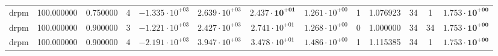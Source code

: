 \begin{table}
\begin{tabular}{ccccccccccccc}
drpm & 100.000000 & 0.750000 & 4 & $-1.335 \cdot 10^{+03}$ & $2.639 \cdot 10^{+03}$ & $\mathbf{2.437 \cdot 10^{+01}}$ & $1.261 \cdot 10^{+00}$ & 1 & 1.076923 & 34 & 1 & $\mathbf{1.753 \cdot 10^{+00}}$ \\
drpm & 100.000000 & 0.900000 & 3 & $-1.221 \cdot 10^{+03}$ & $2.427 \cdot 10^{+03}$ & $2.741 \cdot 10^{+01}$ & $1.268 \cdot 10^{+00}$ & 0 & 1.000000 & 34 & 34 & $\mathbf{1.753 \cdot 10^{+00}}$ \\
drpm & 100.000000 & 0.900000 & 4 & $-2.191 \cdot 10^{+03}$ & $3.947 \cdot 10^{+03}$ & $3.478 \cdot 10^{+01}$ & $1.486 \cdot 10^{+00}$ & 1 & 1.115385 & 34 & 1 & $\mathbf{1.753 \cdot 10^{+00}}$ \\
\bottomrule
\end{tabular}
\end{table}
